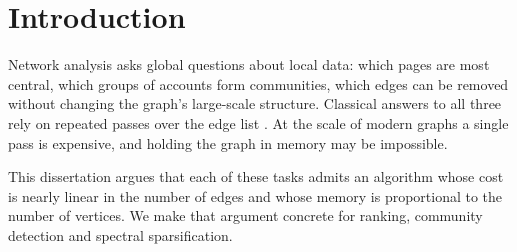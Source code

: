 \chapter{Introduction}
\label{ch:introduction}

Network analysis asks global questions about local data: which pages are most central, which
groups of accounts form communities, which edges can be removed without changing the graph's
large-scale structure. Classical answers to all three rely on repeated passes over the edge
list \citep{page1999, newman2006}. At the scale of modern graphs a single pass is expensive,
and holding the graph in memory may be impossible.

This dissertation argues that each of these tasks admits an algorithm whose cost is nearly
linear in the number of edges and whose memory is proportional to the number of vertices. We
make that argument concrete for ranking, community detection and spectral sparsification.
